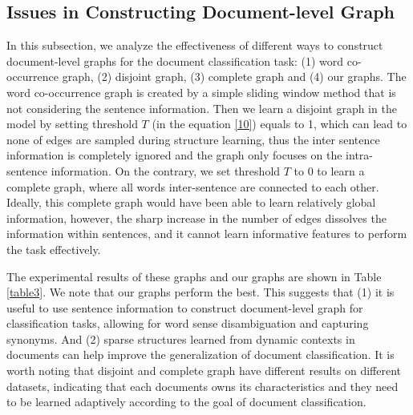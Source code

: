 \documentclass[letterpaper]{article} %
\begin{document}
\subsection{Issues in Constructing Document-level Graph}
In this subsection, we analyze the effectiveness of different ways to construct document-level graphs for the document classification task: (1) word co-occurrence graph, (2) disjoint graph, (3) complete graph and (4) our graphs. The word co-occurrence graph is created by a simple sliding window method that is not considering the sentence information. Then we learn a disjoint graph in the model by setting threshold $T$ (in the equation \ref{10}) equals to 1, which can lead to none of edges are sampled during structure learning, thus the inter sentence information is completely ignored and the graph only focuses on the intra-sentence information. On the contrary, we set threshold $T$ to 0 to learn a complete graph, where all words inter-sentence are connected to each other. Ideally, this complete graph would have been able to learn relatively global information, however, the sharp increase in the number of edges dissolves the information within sentences, and it cannot learn informative features to perform the task effectively.

The experimental results of these graphs and our graphs are shown in Table \ref{table3}. We note that our graphs perform the best. This suggests that (1) it is useful to use sentence information to construct document-level graph for classification tasks, allowing for word sense disambiguation and capturing synonyms. And (2) sparse structures learned from dynamic contexts in documents can help improve the generalization of document classification. It is worth noting that disjoint and complete graph have different results on different datasets, indicating that each documents owns its characteristics and they need to be learned adaptively according to the goal of document classification.
\end{document}
